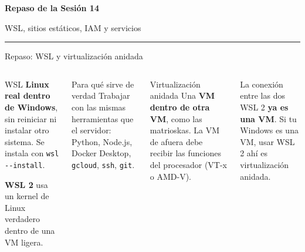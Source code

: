 \documentclass[aspectratio=169,10pt,c]{beamer}
\begin{document}
\begin{frame}[plain]
\vfill
\begin{center}
{\fontsize{29}{34}\selectfont\bfseries Repaso de la Sesión 14}\par
\vspace{2mm}
{\small WSL, sitios estáticos, IAM y servicios}\par
\vspace{4mm}
{\color{utpRojo}\rule{8.5cm}{1.2pt}}
\end{center}
\vfill
\end{frame}

\begin{frame}{Repaso: WSL y virtualización anidada}
\begin{columns}[T,onlytextwidth]
\begin{block}{WSL}
\small \textbf{Linux real dentro de Windows}, sin reiniciar ni instalar otro sistema. Se instala con \texttt{wsl -{}-install}.\par\smallskip
\textbf{WSL 2} usa un kernel de Linux verdadero dentro de una VM ligera.
\end{block}
\begin{exampleblock}{Para qué sirve de verdad}
\small Trabajar con las mismas herramientas que el servidor: Python, Node.js, Docker Desktop, \texttt{gcloud}, \texttt{ssh}, \texttt{git}.
\end{exampleblock}
\begin{block}{Virtualización anidada}
\small Una \textbf{VM dentro de otra VM}, como las matrioskas. La VM de afuera debe recibir las funciones del procesador (VT-x o AMD-V).
\end{block}
\begin{alertblock}{La conexión entre las dos}
\small WSL 2 \textbf{ya es una VM}. Si tu Windows es una VM, usar WSL 2 ahí es virtualización anidada.
\end{alertblock}
\end{columns}
\end{frame}
\end{document}
